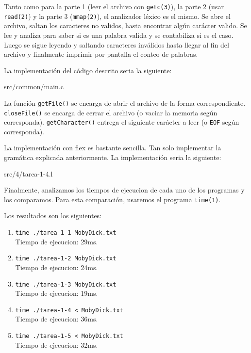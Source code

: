 \documentclass[spanish, fleqn]{article}
\newcommand\tab[1][0.5cm]{\hspace*{#1}}
\begin{document}
Tanto como para la parte 1 (leer el archivo con \texttt{getc(3)}), la parte 2 (usar \texttt{read(2)}) y la parte 3 (\texttt{mmap(2)}), el analizador léxico es el mismo. Se abre el archivo, saltan los caracteres no validos, hasta encontrar algún carácter valido. Se lee y analiza para saber si es una palabra valida y se contabiliza si es el caso. Luego se sigue leyendo y saltando caracteres inválidos hasta llegar al fin del archivo y finalmente imprimir por pantalla el conteo de palabras.

La implementación del código descrito seria la siguiente:

 {src/common/main.c}
    
La función \texttt{getFile()} se encarga de abrir el archivo de la forma correspondiente. \texttt{closeFile()} se encarga de cerrar el archivo (o vaciar la memoria según corresponda). \texttt{getCharacter()} entrega el siguiente carácter a leer (o \texttt{EOF} según corresponda).

La implementación con flex es bastante sencilla. Tan solo implementar la gramática explicada anteriormente. La implementación seria la siguiente:

 {src/4/tarea-1-4.l}
    
Finalmente, analizamos los tiempos de ejecucion de cada uno de los programas y los comparamos. Para esta comparación, usaremos el programa \texttt{time(1)}.

Los resultados son los siguientes:
\begin{enumerate}
    \item \texttt{time ./tarea-1-1 MobyDick.txt} \\ \tab Tiempo de ejecucion: 29ms.
    
    \item \texttt{time ./tarea-1-2 MobyDick.txt} \\ \tab Tiempo de ejecucion: 24ms.
    
    \item \texttt{time ./tarea-1-3 MobyDick.txt} \\ \tab Tiempo de ejecucion: 19ms.
    
    \item \texttt{time ./tarea-1-4 < MobyDick.txt} \\ \tab Tiempo de ejecucion: 36ms.
    
    \item \texttt{time ./tarea-1-5 < MobyDick.txt} \\ \tab Tiempo de ejecucion: 32ms.
\end{enumerate}
\end{document}
